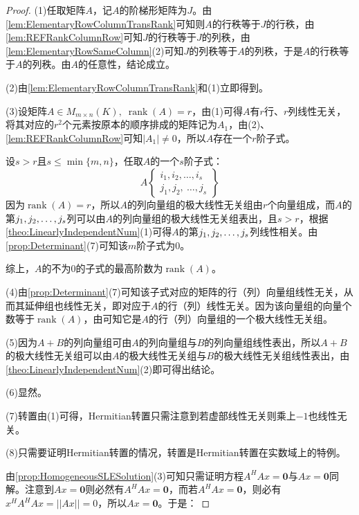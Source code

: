 \begin{proof}
	(1)任取矩阵$A$，记$A$的阶梯形矩阵为$J$。由\cref{lem:ElementaryRowColumnTransRank}可知则$A$的行秩等于$J$的行秩，由\cref{lem:REFRankColumnRow}可知$J$的行秩等于$J$的列秩，由\cref{lem:ElementaryRowSameColumn}(2)可知$J$的列秩等于$A$的列秩，于是$A$的行秩等于$A$的列秩。由$A$的任意性，结论成立。\par
	(2)由\cref{lem:ElementaryRowColumnTransRank}和(1)立即得到。\par
	(3)设矩阵$A\in M_{m\times n}(K),\;\operatorname{rank}(A)=r$，由(1)可得$A$有$r$行、$r$列线性无关，将其对应的$r^2$个元素按原本的顺序排成的矩阵记为$A_1$，由(2)、\cref{lem:REFRankColumnRow}可知$|A_1|\ne0$，所以$A$存在一个$r$阶子式。\par
	设$s>r$且$s\leqslant\min\{m,n\}$，任取$A$的一个$s$阶子式：
	\begin{equation*}
		A\left\{ \begin{array}{l}
			i_1,i_2,\dots,i_s \\
			j_1,j_2,\ \dots,j_s
		\end{array}\right\}
	\end{equation*}
	因为$\operatorname{rank}(A)=r$，所以$A$的列向量组的极大线性无关组由$r$个向量组成，而$A$的第$j_1, j_2, \dots, j_{s}$列可以由$A$的列向量组的极大线性无关组表出，且$s>r$，根据\cref{theo:LinearlyIndependentNum}(1)可得$A$的第$j_1, j_2, \dots, j_{s}$列线性相关。由\cref{prop:Determinant}(7)可知该$m$阶子式为$0$。\par
	综上，$A$的不为$0$的子式的最高阶数为$\operatorname{rank}(A)$。\par
	(4)由\cref{prop:Determinant}(7)可知该子式对应的矩阵的行（列）向量组线性无关，从而其延伸组也线性无关，即对应于$A$的行（列）线性无关。因为该向量组的向量个数等于$\operatorname{rank}(A)$，由可知它是$A$的行（列）向量组的一个极大线性无关组。\par
	(5)因为$A+B$的列向量组可由$A$的列向量组与$B$的列向量组线性表出，所以$A+B$的极大线性无关组可以由$A$的极大线性无关组与$B$的极大线性无关组线性表出，由\cref{theo:LinearlyIndependentNum}(2)即可得出结论。\par
	(6)显然。\par
	(7)转置由(1)可得，Hermitian转置只需注意到若虚部线性无关则乘上$-1$也线性无关。\par
	(8)只需要证明Hermitian转置的情况，转置是Hermitian转置在实数域上的特例。\par
	由\cref{prop:HomogeneousSLESolution}(3)可知只需证明方程$A^HAx=\mathbf{0}$与$Ax=\mathbf{0}$同解。注意到$Ax=\mathbf{0}$则必然有$A^HAx=\mathbf{0}$，而若$A^HAx=\mathbf{0}$，则必有$x^HA^HAx=||Ax||=0$，所以$Ax=\mathbf{0}$。于是：

\end{proof}
